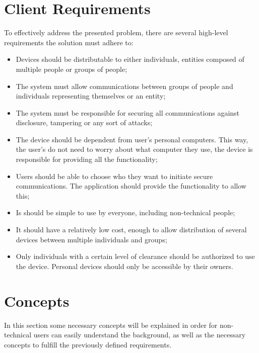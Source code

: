 \section{Client Requirements}\label{chap:problem:requirements}


To effectively address the presented problem, there are several high-level requirements the solution must adhere to:
\begin{itemize}
	\item Devices should be distributable to either individuals, entities composed of multiple people or groups of people;
	\item The system must allow communications between groups of people and individuals representing themselves or an entity;
	\item The system must be responsible for securing all communications against disclosure, tampering or any sort of attacks;
	\item The device should be dependent from user's personal computers. This way, the user's do not need to worry about what computer they use, the device is responsible for providing all the functionality;
	\item Users should be able to choose who they want to initiate secure communications. The application should provide the functionality to allow this;
	\item Is should be simple to use by everyone, including non-technical people;
	\item It should have a relatively low cost, enough to allow distribution of several devices between multiple individuals and groups;
	\item Only individuals with a certain level of clearance should be authorized to use the device. Personal devices should only be accessible by their owners.
\end{itemize}

\section{Concepts}\label{chap:problem:concepts}

In this section some necessary concepts will be explained in order for non-technical users can easily understand the background, as well as the necessary concepts to fulfill the previously defined requirements.

